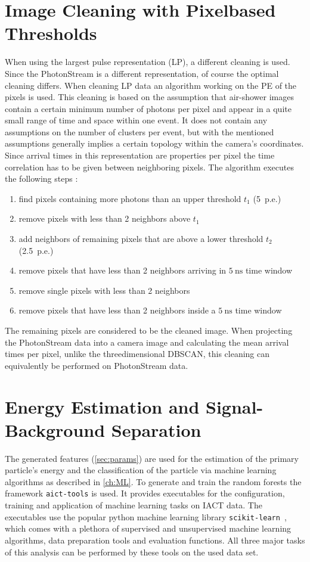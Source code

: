 \section{Image Cleaning with Pixelbased Thresholds}
\label{sec:thresh}
%
When using the largest pulse representation (LP), a different cleaning is
used. Since the PhotonStream is a different representation, of course the
optimal cleaning differs. When cleaning LP data an algorithm working on the PE
of the pixels is used. This cleaning is based on the assumption that air-shower
images contain a certain minimum number of photons per pixel and appear in a
quite small range of time and space within one event. It does not contain any
assumptions on the number of clusters per event, but with the mentioned
assumptions generally implies a certain topology within the camera's
coordinates. Since arrival times in this representation are properties per
pixel the time correlation has to be given between neighboring pixels. The
algorithm executes the following steps \cite{facttools}:
%
\begin{enumerate}
  \item find pixels containing more photons than an upper threshold $t_1$ (5~p.e.)
  \item remove pixels with less than 2 neighbors above $t_1$
  \item add neighbors of remaining pixels that are above a lower threshold $t_2$ (2.5~p.e.)
  \item remove pixels that have less than 2 neighbors arriving in $\SI{5}{\nano\second}$ time window
  \item remove single pixels with less than 2 neighbors
  \item remove pixels that have less than 2 neighbors inside a $\SI{5}{\nano\second}$ time window
\end{enumerate}
%
The remaining pixels are considered to be the cleaned image. When projecting
the PhotonStream data into a camera image and calculating the mean arrival
times per pixel, unlike the threedimensional DBSCAN, this cleaning can
equivalently be performed on PhotonStream data.


\section{Energy Estimation and Signal-Background Separation}
%
The generated features (\autoref{sec:params}) are used for the estimation of
the primary particle's energy and the classification of the particle via
machine learning algorithms as described in \autoref{ch:ML}. To generate and
train the random forests the framework \texttt{aict-tools} \cite{aicttools} is
used. It provides executables for the configuration, training and application 
of machine learning tasks on IACT data. The executables use the popular python
machine learning library \texttt{scikit-learn}~\cite{scikit-learn}, which comes
with a plethora of supervised and unsupervised machine learning algorithms,
data preparation tools and evaluation functions. All three major tasks of this
analysis can be performed by these tools on the used data set.
